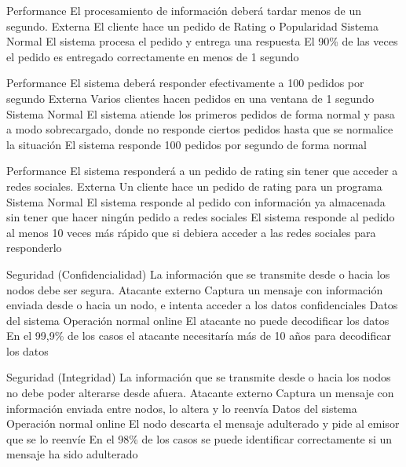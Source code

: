\begin{enumerate}
\QA
  {Performance} %
  {El procesamiento de información deberá tardar menos de un segundo.} %
  {Externa} %
  {El cliente hace un pedido de Rating o Popularidad} %
  {Sistema} %
  {Normal} %
  {El sistema procesa el pedido y entrega una respuesta} %
  {El 90\% de las veces el pedido es entregado correctamente en menos de 1 segundo} %

\QA
  {Performance} %
  {El sistema deberá responder efectivamente a 100 pedidos por segundo} %
  {Externa} %
  {Varios clientes hacen pedidos en una ventana de 1 segundo} %
  {Sistema} %
  {Normal} %
  {El sistema atiende los primeros pedidos de forma normal y pasa a modo sobrecargado, donde no responde ciertos pedidos hasta que se normalice la situación} %
  {El sistema responde 100 pedidos por segundo de forma normal} %

\QA
  {Performance} %
  {El sistema responderá a un pedido de rating sin tener que acceder a redes sociales.} %
  {Externa} %
  {Un cliente hace un pedido de rating para un programa} %
  {Sistema} %
  {Normal} %
  {El sistema responde al pedido con información ya almacenada sin tener que hacer ningún pedido a redes sociales} %
  {El sistema responde al pedido al menos 10 veces más rápido que si debiera acceder a las redes sociales para responderlo} %



\QA
  {Seguridad (Confidencialidad)} %
  {La información que se transmite desde o hacia los nodos debe ser segura.} %
  {Atacante externo} %
  {Captura un mensaje con información enviada desde o hacia un nodo, e intenta acceder a los datos confidenciales} %
  {Datos del sistema} %
  {Operación normal online} %
  {El atacante no puede decodificar los datos} %
  {En el 99,9\% de los casos el atacante necesitaría más de 10 años para decodificar los datos} %

\QA
  {Seguridad (Integridad)} %
  {La información que se transmite desde o hacia los nodos no debe poder alterarse desde afuera.} %
  {Atacante externo} %
  {Captura un mensaje con información enviada entre nodos, lo altera y lo reenvía} %
  {Datos del sistema} %
  {Operación normal online} %
  {El nodo descarta el mensaje adulterado y pide al emisor que se lo reenvíe} %
  {En el 98\% de los casos se puede identificar correctamente si un mensaje ha sido adulterado} %


\end{enumerate}
